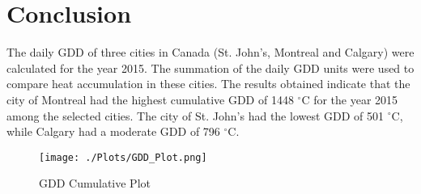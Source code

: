 \documentclass{article}
\begin{document}
\section{Conclusion}
The daily GDD of three cities in Canada (St. John's, Montreal and Calgary) were calculated for the year 2015. The summation of the daily GDD units were used to compare heat accumulation in these cities. The results obtained indicate that the city of Montreal had the highest cumulative GDD of 1448 $^{\circ}$C for the year 2015 among the selected cities. The city of St. John's had the lowest GDD of 501 $^{\circ}$C, while Calgary had a moderate GDD of 796 $^{\circ}$C.




\begin{figure}[h!]
\centering
\texttt{[image: ./Plots/GDD\_Plot.png]}
\caption{GDD Cumulative Plot}
\label{fig: GDD Plot}
\end{figure}
\end{document}
